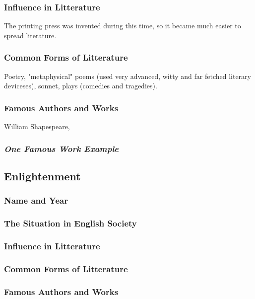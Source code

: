 \subsubsection{Influence in Litterature}
The printing press was invented during this time, so it became much easier to spread literature.

\subsubsection{Common Forms of Litterature}
Poetry, "metaphysical" poems (used very advanced, witty and far fetched literary deviceses), sonnet, plays (comedies and tragedies).

\subsubsection{Famous Authors and Works}
William Shapespeare, 

\subsubsection{\textit{One Famous Work Example}}

\newpage
\subsection{Enlightenment}

\subsubsection{Name and Year}

\subsubsection{The Situation in English Society}

\subsubsection{Influence in Litterature}

\subsubsection{Common Forms of Litterature}

\subsubsection{Famous Authors and Works}


